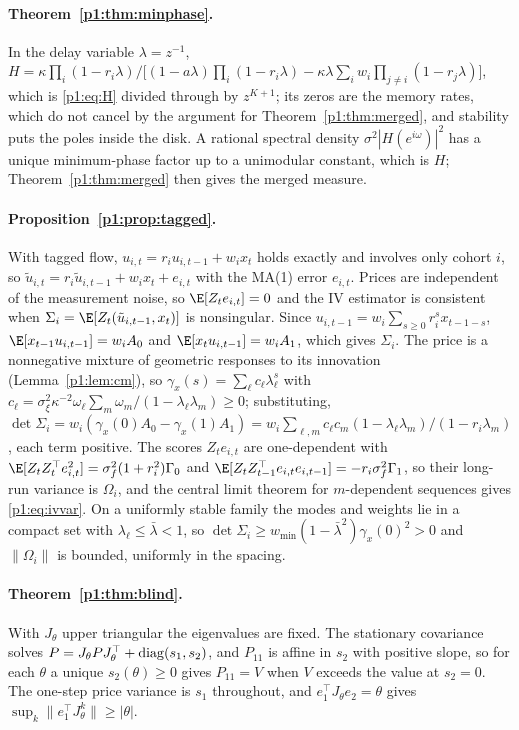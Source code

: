 \paragraph{Theorem~\ref{p1:thm:minphase}.} In the delay variable $\lambda=z^{-1}$, $H=\kappa\prod_i(1-r_i\lambda)/\bigl[(1-a\lambda)\prod_i(1-r_i\lambda)-\kappa\lambda\sum_iw_i\prod_{j\ne i}(1-r_j\lambda)\bigr]$, which is \eqref{p1:eq:H} divided through by $z^{K+1}$; its zeros are the memory rates, which do not cancel by the argument for Theorem~\ref{p1:thm:merged}, and stability puts the poles inside the disk. A rational spectral density $\sigma^2|H(e^{i\omega})|^2$ has a unique minimum-phase factor up to a unimodular constant, which is $H$; Theorem~\ref{p1:thm:merged} then gives the merged measure.

\paragraph{Proposition~\ref{p1:prop:tagged}.} With tagged flow, $u_{i,t}=r_iu_{i,t-1}+w_ix_t$ holds exactly and involves only cohort $i$, so $\tilde u_{i,t}=r_i\tilde u_{i,t-1}+w_ix_t+e_{i,t}$ with the MA(1) error $e_{i,t}$. Prices are independent of the measurement noise, so $\E[Z_te_{i,t}]=0$ and the IV estimator is consistent when $\Sigma_i=\E[Z_t(\tilde u_{i,t-1},x_t)]$ is nonsingular. Since $u_{i,t-1}=w_i\sum_{s\ge0}r_i^sx_{t-1-s}$, $\E[x_{t-1}u_{i,t-1}]=w_iA_0$ and $\E[x_tu_{i,t-1}]=w_iA_1$, which gives $\Sigma_i$. The price is a nonnegative mixture of geometric responses to its innovation (Lemma~\ref{p1:lem:cm}), so $\gamma_x(s)=\sum_\ell c_\ell\lambda_\ell^{s}$ with $c_\ell=\sigma_\xi^2\kappa^{-2}\omega_\ell\sum_m\omega_m/(1-\lambda_\ell\lambda_m)\ge0$; substituting, $\det\Sigma_i=w_i(\gamma_x(0)A_0-\gamma_x(1)A_1)=w_i\sum_{\ell,m}c_\ell c_m(1-\lambda_\ell\lambda_m)/(1-r_i\lambda_m)$, each term positive. The scores $Z_te_{i,t}$ are one-dependent with $\E[Z_tZ_t^\top e_{i,t}^2]=\sigma_f^2(1+r_i^2)\Gamma_0$ and $\E[Z_tZ_{t-1}^\top e_{i,t}e_{i,t-1}]=-r_i\sigma_f^2\Gamma_1$, so their long-run variance is $\Omega_i$, and the central limit theorem for $m$-dependent sequences gives \eqref{p1:eq:ivvar}. On a uniformly stable family the modes and weights lie in a compact set with $\lambda_\ell\le\bar\lambda<1$, so $\det\Sigma_i\ge w_{\min}(1-\bar\lambda^2)\gamma_x(0)^2>0$ and $\|\Omega_i\|$ is bounded, uniformly in the spacing.

\paragraph{Theorem~\ref{p1:thm:blind}.} With $J_\theta$ upper triangular the eigenvalues are fixed. The stationary covariance solves $P=J_\theta PJ_\theta^\top+{\rm diag}(s_1,s_2)$, and $P_{11}$ is affine in $s_2$ with positive slope, so for each $\theta$ a unique $s_2(\theta)\ge0$ gives $P_{11}=V$ when $V$ exceeds the value at $s_2=0$. The one-step price variance is $s_1$ throughout, and $e_1^\top J_\theta e_2=\theta$ gives $\sup_k\|e_1^\top J_\theta^k\|\ge|\theta|$.

